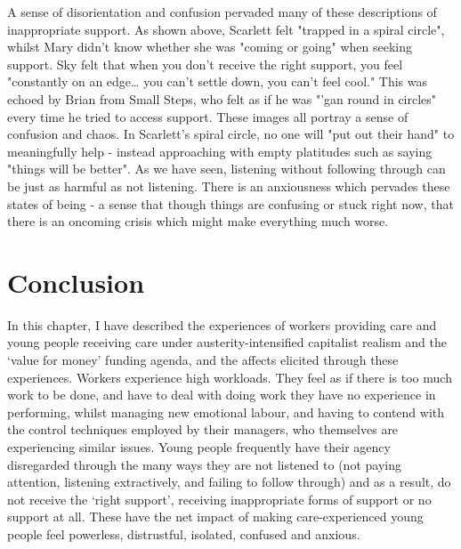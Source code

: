 A sense of disorientation and confusion pervaded many of these descriptions of inappropriate support. As shown above, Scarlett felt "trapped in a spiral circle", whilst Mary didn’t know whether she was "coming or going" when seeking support. Sky felt that when you don’t receive the right support, you feel "constantly on an edge… you can’t settle down, you can’t feel cool." This was echoed by Brian from Small Steps, who felt as if he was "'gan round in circles" every time he tried to access support. These images all portray a sense of confusion and chaos. In Scarlett's spiral circle, no one will "put out their hand" to meaningfully help - instead approaching with empty platitudes such as saying "things will be better". As we have seen, listening without following through can be just as harmful as not listening. There is an anxiousness which pervades these states of being - a sense that though things are confusing or stuck right now, that there is an oncoming crisis which might make everything much worse. 

\section{Conclusion}
In this chapter, I have described the experiences of workers providing care and young people receiving care under austerity-intensified capitalist realism and the `value for money' funding agenda, and the affects elicited through these experiences. Workers experience high workloads. They feel as if there is too much work to be done, and have to deal with doing work they have no experience in performing, whilst managing new emotional labour, and having to contend with the control techniques employed by their managers, who themselves are experiencing  similar issues. Young people frequently have their agency disregarded through the many ways they are not listened to (not paying attention, listening extractively, and failing to follow through) and as a result, do not receive the `right support', receiving inappropriate forms of support or no support at all. These have the net impact of making care-experienced young people feel powerless, distrustful, isolated, confused and anxious. 

